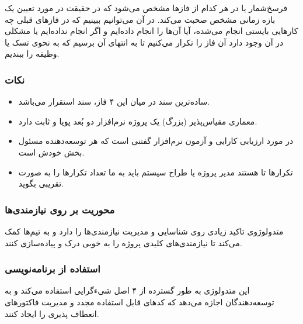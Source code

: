 \documentclass[a4paper]{article}
\begin{document}
فرسخ‌شمار یا  در هر کدام از فاز‌ها مشخص می‌شود که در حقیقت در مورد
تعیین یک بازه زمانی مشخص صحبت می‌کند. در آن می‌توانیم ببینیم که در فاز‌های قبلی
چه کار‌هایی بایستی انجام می‌شده، آیا آن‌ها را انجام داده‌ایم و اگر انجام
نداده‌ایم یا مشکلی در آن وجود دارد آن فاز را تکرار می‌کنیم تا به انتهای آن برسیم
که به نحوی تسک یا وظیفه را ببندیم.

\subsubsection*{نکات}

\begin{itemize}
    \item ساده‌ترین سند در میان این ۴ فاز، سند استقرار می‌باشد.
    \item معماری مقیاس‌پذیر (بزرگ) یک پروژه نرم‌افزار دو بُعد پویا و ثابت دارد.
    \item در مورد ارزیابی کارایی و آزمون نرم‌افزار گفتنی است که هر توسعه‌دهنده
    مسئول  بخش خودش است.
    \item تکرار‌ها  تا هستند مدیر پروژه یا طراح سیستم باید به ما تعداد
    تکرار‌ها را به صورت تقریبی بگوید.
\end{itemize}

\subsubsection{محوریت بر روی نیازمندی‌ها}

متدولوژوی  تاکید زیادی روی شناسایی و مدیریت نیازمندی‌ها را دارد و به
تیم‌ها کمک می‌‌کند تا نیازمندی‌های کلیدی پروژه‌ را به خوبی درک و پیاده‌سازی
کنند.

\subsubsection{استفاده از برنامه‌نویسی }

این متدولوژی به طور گسترده از ۴ اصل شیء‌گرایی استفاده می‌کند و به توسعه‌دهندگان
اجازه می‌دهد که کد‌های قابل استفاده مجدد و مدیریت فاکتور‌های انعطاف پذیری را
ایجاد کنند.



\end{document}
